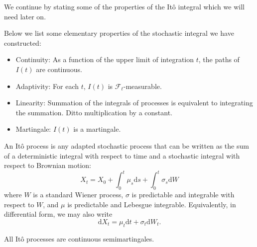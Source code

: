 We continue by stating some of the properties of the It\^{o} integral
which we will need later on.

\begin{remark}
    Below we list some elementary properties of the stochastic integral we have
    constructed:
    \begin{itemize}
        \item Continuity: As a function of the upper limit of integration $t$, the 
        paths of $I(t)$ are continuous.
        \item Adaptivity: For each $t$, $I(t)$ is $\mathcal{F}_t$-measurable.
        \item Linearity: Summation of the integrals of processes is equivalent to
        integrating the summation. Ditto multiplication by a constant.
        \item Martingale: $I(t)$ is a martingale.
    \end{itemize}
\end{remark}

\begin{definition}[It\^{o} Processes]
    An It\^{o} process is any adapted stochastic process that can be written as the sum of a 
    deterministic integral with respect to time and a stochastic integral with respect to Brownian motion:
    \begin{equation}
        X_t=X_0+\int_0^t\mu_s\mathrm ds+\int_0^t\sigma_s\mathrm dW
    \end{equation}
    where $W$ is a standard Wiener process, $\sigma$ is predictable and integrable with respect to $W$,
    and $\mu$ is predictable and Lebesgue integrable. Equivalently, in differential form, we 
    may also write
    \begin{equation}
        \mathrm dX_t=\mu_t\mathrm dt + \sigma_t\mathrm dW_t.
    \end{equation}
\end{definition}

\begin{remark}
    All It\^{o} processes are continuous semimartingales.
\end{remark}

